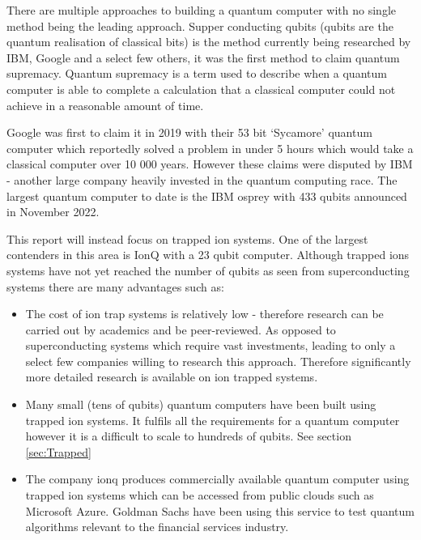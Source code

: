 There are multiple approaches to building a quantum computer with no single method being the leading approach.
Supper conducting qubits (qubits are the quantum realisation of classical bits) is the method currently being researched by IBM, Google and a select few others, it was the first method to claim quantum supremacy. \cite{gibney_hello_2019}
Quantum supremacy is a term used to describe when a quantum computer is able to complete a calculation that a classical computer could not achieve in a reasonable amount of time. 

Google was first to claim it in 2019 with their 53 bit `Sycamore' quantum computer which reportedly solved a problem in under 5 hours which would take a classical computer over 10 000 years. \cite{gibney_hello_2019} 
However these claims were disputed by IBM - another large company heavily invested in the quantum computing race.
The largest quantum computer to date is the IBM osprey with 433 qubits announced in November 2022.
\vspace{1em}

This report will instead focus on trapped ion systems. 
One of the largest contenders in this area is IonQ with a 23 qubit computer. 
 Although trapped ions systems have not yet reached the number of qubits as seen from superconducting systems there are many advantages such as: 
\begin{itemize}
    \item The cost of ion trap systems is relatively low - therefore research can be carried out by academics and be peer-reviewed. As opposed to superconducting systems which require vast investments, leading to only a select few companies willing to research this approach. Therefore significantly more detailed research is available on ion trapped systems.  
    \item Many small (tens of qubits) quantum computers have been built using trapped ion systems. It fulfils all the requirements for a quantum computer however it is a difficult to scale to hundreds of qubits. See section \ref{sec:Trapped}
    \item The company ionq produces commercially available quantum computer using trapped ion systems which can be accessed from public clouds such as Microsoft Azure. \cite{sonialopezbravo_ionq_nodate} Goldman Sachs have been using this service to test quantum algorithms relevant to the financial services industry. \cite{noauthor_goldman_2021}
\end{itemize}



